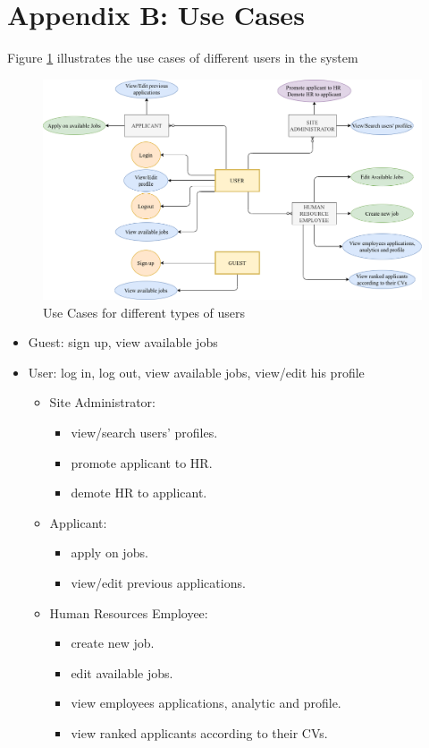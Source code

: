 \newpage
\section*{Appendix B: Use Cases}
\label{sec:appendix_b}

Figure \ref{fig:use_cases} illustrates the use cases of different users in the system


\begin{figure}[h!]
\includegraphics[scale=0.45, frame]{images/Use Cases.png}
\caption{Use Cases for different types of users}
\label{fig:use_cases}
\end{figure}

\begin{itemize}
    \item Guest: sign up, view available jobs
    \item User: log in, log out, view available jobs, view/edit his profile
    \begin{itemize}
        \item Site Administrator: 
        \begin{itemize}
            \item view/search users' profiles.
            \item promote applicant to HR.
            \item demote HR to applicant.
        \end{itemize}
        \item Applicant: 
        \begin{itemize}
            \item apply on jobs.
            \item view/edit previous applications.
        \end{itemize}
        \item Human Resources Employee: 
        \begin{itemize}
            \item create new job.
            \item edit available jobs.
            \item view employees applications, analytic and profile.
            \item view ranked applicants according to their CVs.
        \end{itemize}
    \end{itemize}
\end{itemize}
